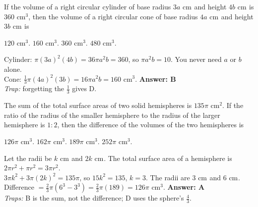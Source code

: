 \documentclass[11pt,addpoints]{exam}
\newcommand{\cm}[1]{\text{ cm}^{#1}}
\begin{document}
\begin{questions}
If the volume of a right circular cylinder of base radius $3a\cm{}$ and height $4b\cm{}$ is $360\cm3$, then the volume of a right circular cone of base radius $4a\cm{}$ and height $3b\cm{}$ is
\begin{oneparchoices}
  \choice $120\cm3$. \CorrectChoice $160\cm3$. \choice $360\cm3$. \choice $480\cm3$.
\end{oneparchoices}
\begin{solution}
Cylinder: $\pi(3a)^2(4b) = 36\pi a^2 b = 360$, so $\pi a^2 b = 10$. You never need $a$ or $b$ alone.\\
Cone: $\frac13\pi(4a)^2(3b) = 16\pi a^2 b = 160\cm3$. \quad \textbf{Answer: B} \\
\emph{Trap:} forgetting the $\frac13$ gives D.
\end{solution}

The sum of the total surface areas of two solid hemispheres is $135\pi\cm2$. If the ratio of the radius of the smaller hemisphere to the radius of the larger hemisphere is $1 : 2$, then the difference of the volumes of the two hemispheres is
\begin{oneparchoices}
  \CorrectChoice $126\pi\cm3$. \choice $162\pi\cm3$. \choice $189\pi\cm3$. \choice $252\pi\cm3$.
\end{oneparchoices}
\begin{solution}
Let the radii be $k\cm{}$ and $2k\cm{}$. The total surface area of a hemisphere is $2\pi r^2 + \pi r^2 = 3\pi r^2$.\\
$3\pi k^2 + 3\pi(2k)^2 = 135\pi$, so $15k^2 = 135$, $k = 3$. The radii are $3\cm{}$ and $6\cm{}$.\\
Difference $= \frac23\pi(6^3 - 3^3) = \frac23\pi(189) = 126\pi\cm3$. \quad \textbf{Answer: A} \\
\emph{Traps:} B is the sum, not the difference; D uses the sphere's $\frac43$.
\end{solution}


\end{questions}
\end{document}

